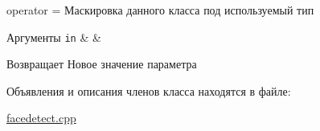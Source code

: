 operator = Маскировка данного класса под используемый тип 


\begin{DoxyParams}[1]{Аргументы}
\mbox{\tt in}  & {\em } & \\
\hline
\end{DoxyParams}
\begin{DoxyReturn}{Возвращает}
Новое значение параметра 
\end{DoxyReturn}


Объявления и описания членов класса находятся в файле\-:\begin{DoxyCompactItemize}
\item 
\hyperlink{facedetect_8cpp}{facedetect.\-cpp}\end{DoxyCompactItemize}
